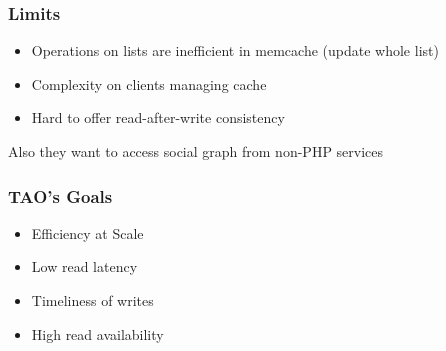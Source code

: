 \begin{frame}
\frametitle{Limits}
    \begin{itemize}
    	\item Operations on lists are inefficient in memcache (update whole list)
    	\item Complexity on clients managing cache
    	\item Hard to offer read-after-write consistency
    \end{itemize}
Also they want to access social graph from non-PHP services
\end{frame}

\begin{frame}
\frametitle{TAO's Goals}
	\begin{itemize}
		\item Efficiency at Scale
		\pause
		\item Low read latency
		\pause
		\item Timeliness of writes
		\pause
		\item High read availability
	\end{itemize}
\end{frame}

